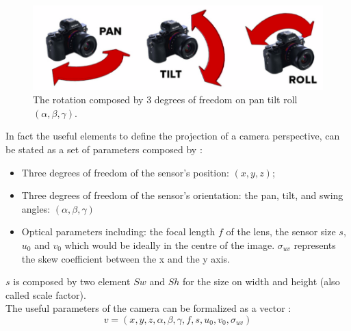  
\begin{figure}[t!]
\begin{center}
   \includegraphics[width=\linewidth]{img/PanTiltRoll.png}
  \caption{ The rotation composed by 3 degrees of freedom on pan tilt roll$(\alpha,\beta,\gamma)$.}\label{fig:PanTiltRoll}
  \endminipage\hfill
  \end{center}
\end{figure}

In fact the useful elements to define the projection of a camera perspective, can be stated as a set of parameters composed by :\\
\begin{itemize}
\item Three degrees of freedom of the sensor’s position: $(x, y, z)$;
\item Three degrees of freedom of the sensor’s orientation: the pan, tilt, and swing angles: $(\alpha,\beta, \gamma)$ 
\item Optical parameters including: the focal length $f$ of the lens, the sensor size $s$,  $ u_{0}$ and $v_0 $  which would be ideally in the centre of the image. $\sigma_{uv}$ represents the skew coefficient between the x and the y axis.
\end{itemize}
$s$ is composed by two element $Sw$ and $Sh$ for the size on width and height (also called scale factor).\\

The useful parameters of the camera can be formalized as a vector :
\begin{equation}\label{eq:v}
v=(x,y,z,\alpha ,\beta,\gamma,f,s,u_0,v_0,\sigma_{uv})
\end{equation}

